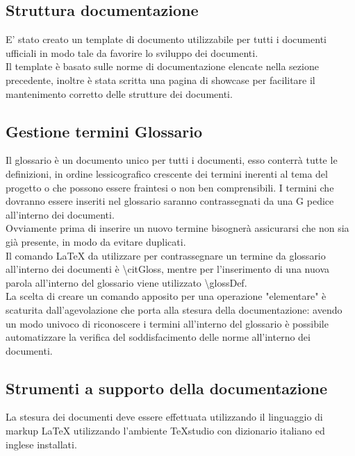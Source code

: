 \documentclass[NormeDiProgetto.tex]{subfiles}
\begin{document}
	\subsection{Struttura documentazione}
	E' stato creato un template di documento utilizzabile per tutti i documenti ufficiali in modo tale da favorire lo sviluppo dei documenti.\\
	Il template è basato sulle norme di documentazione elencate nella sezione precedente, inoltre è stata scritta una pagina di showcase per facilitare il mantenimento corretto delle strutture dei documenti. %
	
	\subsection{Gestione termini Glossario}
	Il glossario è un documento unico per tutti i documenti, esso conterrà tutte le definizioni, in ordine lessicografico crescente dei termini inerenti al tema del progetto o che possono essere fraintesi o non ben comprensibili. I termini che dovranno essere inseriti nel glossario saranno contrassegnati da una G pedice all'interno dei documenti.\\
	Ovviamente prima di inserire un nuovo termine bisognerà assicurarsi che non sia già presente, in modo da evitare duplicati. \\
	Il comando \LaTeX{}  da utilizzare per contrassegnare un termine da glossario all'interno dei documenti è \textbackslash{}citGloss, mentre per l’inserimento di una nuova parola all'interno del glossario viene utilizzato \textbackslash{}glossDef.\\ %
	La scelta di creare un comando apposito per una operazione "elementare" è scaturita dall'agevolazione che porta alla stesura della documentazione: avendo un modo univoco di riconoscere i termini all'interno del glossario è possibile automatizzare la verifica del soddisfacimento delle norme all'interno dei documenti.
	
	\subsection{Strumenti a supporto della documentazione} %
	La stesura dei documenti deve essere effettuata utilizzando il linguaggio di markup \LaTeX{}  utilizzando l'ambiente TeXstudio con dizionario italiano ed inglese installati.
	
\end{document}
